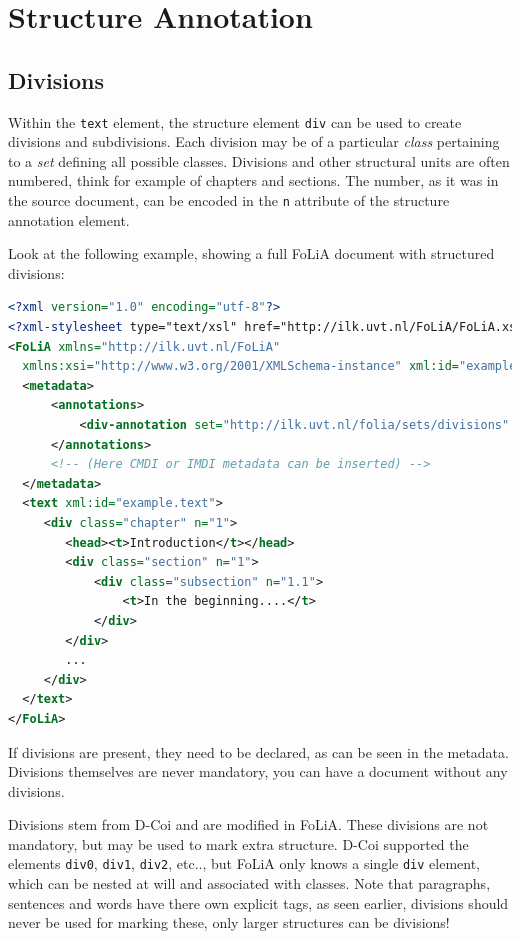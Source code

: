 \documentclass[a4paper,12pt]{report}
\begin{document}
\section{Structure Annotation}

\subsection{Divisions}

Within the \texttt{text} element, the structure element \texttt{div} can be used to create divisions and subdivisions. Each division may be of a particular \emph{class} pertaining to a \emph{set} defining all possible classes. Divisions and other structural units are often numbered, think for example of chapters and sections. The number, as it was in the source document, can be encoded in the \texttt{n} attribute of the structure annotation element.

Look at the following example, showing a full FoLiA document with structured divisions: 

\begin{lstlisting}[language=xml]
<?xml version="1.0" encoding="utf-8"?>
<?xml-stylesheet type="text/xsl" href="http://ilk.uvt.nl/FoLiA/FoLiA.xsl"?>
<FoLiA xmlns="http://ilk.uvt.nl/FoLiA"
  xmlns:xsi="http://www.w3.org/2001/XMLSchema-instance" xml:id="example">
  <metadata>
      <annotations>
          <div-annotation set="http://ilk.uvt.nl/folia/sets/divisions" />
      </annotations>    
      <!-- (Here CMDI or IMDI metadata can be inserted) -->
  </metadata>
  <text xml:id="example.text">
     <div class="chapter" n="1">
        <head><t>Introduction</t></head>
        <div class="section" n="1">
            <div class="subsection" n="1.1">
                <t>In the beginning....</t>
            </div>
        </div>
        ...
     </div>
  </text>
</FoLiA>  
\end{lstlisting}

If divisions are present, they need to be declared, as can be seen in the metadata. Divisions themselves are never mandatory, you can have a document without any divisions.

Divisions stem from D-Coi and are modified in FoLiA. These divisions are not mandatory, but may be used to mark extra structure. D-Coi supported the elements \texttt{div0}, \texttt{div1}, \texttt{div2}, etc.., but FoLiA only knows a single \texttt{div} element, which can be nested at will and associated with classes. Note that paragraphs, sentences and words have there own explicit tags, as seen earlier, divisions should never be used for marking these, only larger structures can be divisions!
\end{document}
